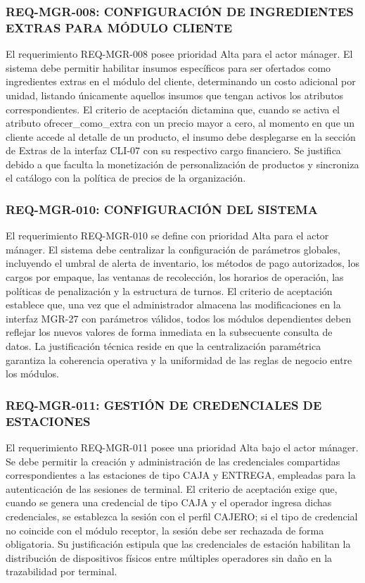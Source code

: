 \subsubsection{REQ-MGR-008: CONFIGURACIÓN DE INGREDIENTES EXTRAS PARA MÓDULO CLIENTE}
El requerimiento REQ-MGR-008 posee prioridad Alta para el actor mánager. El sistema debe permitir habilitar insumos específicos para ser ofertados como ingredientes extras en el módulo del cliente, determinando un costo adicional por unidad, listando únicamente aquellos insumos que tengan activos los atributos correspondientes. El criterio de aceptación dictamina que, cuando se activa el atributo ofrecer\_como\_extra con un precio mayor a cero, al momento en que un cliente accede al detalle de un producto, el insumo debe desplegarse en la sección de Extras de la interfaz CLI-07 con su respectivo cargo financiero. Se justifica debido a que faculta la monetización de personalización de productos y sincroniza el catálogo con la política de precios de la organización.

\subsubsection{REQ-MGR-010: CONFIGURACIÓN DEL SISTEMA}
El requerimiento REQ-MGR-010 se define con prioridad Alta para el actor mánager. El sistema debe centralizar la configuración de parámetros globales, incluyendo el umbral de alerta de inventario, los métodos de pago autorizados, los cargos por empaque, las ventanas de recolección, los horarios de operación, las políticas de penalización y la estructura de turnos. El criterio de aceptación establece que, una vez que el administrador almacena las modificaciones en la interfaz MGR-27 con parámetros válidos, todos los módulos dependientes deben reflejar los nuevos valores de forma inmediata en la subsecuente consulta de datos. La justificación técnica reside en que la centralización paramétrica garantiza la coherencia operativa y la uniformidad de las reglas de negocio entre los módulos.

\subsubsection{REQ-MGR-011: GESTIÓN DE CREDENCIALES DE ESTACIONES}
El requerimiento REQ-MGR-011 posee una prioridad Alta bajo el actor mánager. Se debe permitir la creación y administración de las credenciales compartidas correspondientes a las estaciones de tipo CAJA y ENTREGA, empleadas para la autenticación de las sesiones de terminal. El criterio de aceptación exige que, cuando se genera una credencial de tipo CAJA y el operador ingresa dichas credenciales, se establezca la sesión con el perfil CAJERO; si el tipo de credencial no coincide con el módulo receptor, la sesión debe ser rechazada de forma obligatoria. Su justificación estipula que las credenciales de estación habilitan la distribución de dispositivos físicos entre múltiples operadores sin daño en la trazabilidad por terminal.

